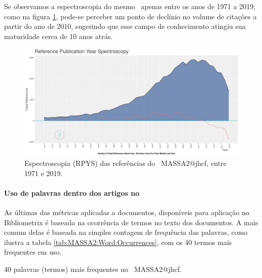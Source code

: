 Se observamos a espectroscopia do mesmo \dataset\ apenas entre os anos de 1971 a 2019, como na figura \ref{fig:MASSA2-ReferenceSpectroscopy:1971:2019}, pode-se perceber um ponto de declínio no volume de citações a partir do ano de 2010, sugerindo que esse campo de conhecimento atingiu sua maturidade cerca de 10 anos atrás.

\begin{figure}
    \centering
    \includegraphics[width=1\textwidth]{exploratory-data-analysis/jhcf/PesqBibliogr/SimulacaoMultiagente/WoS-20220203/Metricas/Documentos/MASSA2-ReferenceSpectroscopy-1971-2019.png}
    \caption{Espectroscopia (RPYS) das referências do \dataset\ MASSA2@jhcf, entre 1971 e 2019.}
    \label{fig:MASSA2-ReferenceSpectroscopy:1971:2019}
\end{figure}

\paragraph{Uso de palavras dentro dos artigos no \dataset}

As últimas das métricas aplicadas a documentos, disponíveis para aplicação no Bibliometrix é baseada na ocorrência de termos no texto dos documentos. A mais comum delas é baseada na simples contagem de frequência das palavras, como ilustra a tabela \ref{tab:MASSA2:Word:Occurrences}, com os 40 termos mais frequentes em uso.

\begin{table}[htp]
    \centering
\footnotesize
{}

    \caption{40 palavras (termos) mais frequentes no \dataset\ MASSA2@jhcf.}
    \label{tab:MASSA2:Word:Occurrences}
\end{table}

